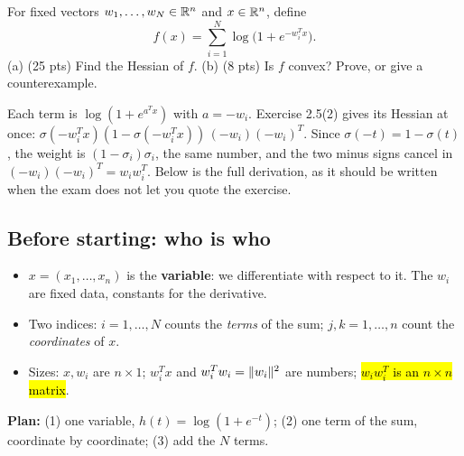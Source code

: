 \begin{example}
For fixed vectors $w_1,\dots,w_N\in\mathbb{R}^n$ and $x\in\mathbb{R}^n$, define
\[ f(x)=\sum_{i=1}^N\log\big(1+e^{-w_i^Tx}\big). \]
(a) (25 pts) Find the Hessian of $f$. \quad (b) (8 pts) Is $f$ convex? Prove, or give a counterexample.
\end{example}

\begin{intuition}[Recognize it: Exercise 2.5 with $a=-w_i$]
Each term is $\log(1+e^{a^Tx})$ with $a=-w_i$. Exercise 2.5(2) gives its Hessian at once: $\sigma(-w_i^Tx)(1-\sigma(-w_i^Tx))\,(-w_i)(-w_i)^T$.
Since $\sigma(-t)=1-\sigma(t)$, the weight is $(1-\sigma_i)\sigma_i$, the same number, and the two minus signs cancel in $(-w_i)(-w_i)^T=w_iw_i^T$.
Below is the full derivation, as it should be written when the exam does not let you quote the exercise.
\end{intuition}

\subsection*{Before starting: who is who}
\begin{itemize}
  \item $x=(x_1,\dots,x_n)$ is the \textbf{variable}: we differentiate with respect to it. The $w_i$ are fixed data, constants for the derivative.
  \item Two indices: $i=1,\dots,N$ counts the \emph{terms} of the sum; $j,k=1,\dots,n$ count the \emph{coordinates} of $x$.
  \item Sizes: $x,w_i$ are $n\times1$; $w_i^Tx$ and $w_i^Tw_i=\lVert w_i\rVert^2$ are numbers; \hl{$w_iw_i^T$ is an $n\times n$ matrix}.
\end{itemize}
\textbf{Plan:} (1) one variable, $h(t)=\log(1+e^{-t})$; (2) one term of the sum, coordinate by coordinate; (3) add the $N$ terms.

